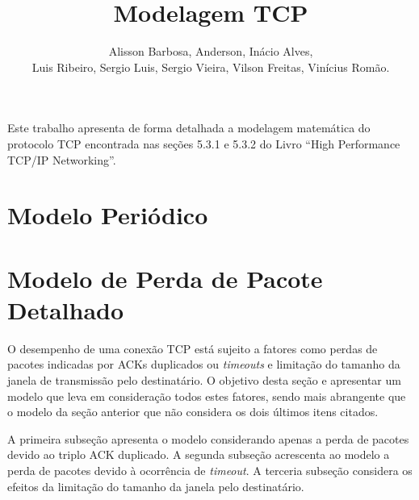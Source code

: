 \documentclass[12pt]{article}
\title{Modelagem TCP}
\author{Alisson Barbosa, Anderson, Inácio Alves, \\ 
  Luis Ribeiro, Sergio Luis, Sergio Vieira, Vilson Freitas, 
  Vinícius Romão.}
\begin{document}
 

\maketitle

     
\begin{resumo} 
  Este trabalho apresenta de forma detalhada a modelagem matemática do protocolo
  TCP encontrada nas seções 5.3.1 e 5.3.2 do Livro ``High Performance TCP/IP Networking''.
\end{resumo}


\section{Modelo Periódico}



\section{Modelo de Perda de Pacote Detalhado}
O desempenho de uma conexão TCP está sujeito a fatores como perdas de pacotes indicadas por 
ACKs duplicados ou \textit{timeouts} e limitação do tamanho da janela de transmissão pelo 
destinatário. O objetivo desta seção e apresentar um modelo que leva em consideração todos 
estes fatores, sendo mais abrangente que o modelo da seção anterior que não considera os dois
últimos itens citados.

A primeira subseção apresenta o modelo considerando apenas a perda de pacotes devido ao 
triplo ACK duplicado. A segunda subseção acrescenta ao modelo a perda de pacotes devido à
ocorrência de \textit{timeout}. A terceria subseção considera os efeitos da limitação do 
tamanho da janela pelo destinatário.



\end{document}
